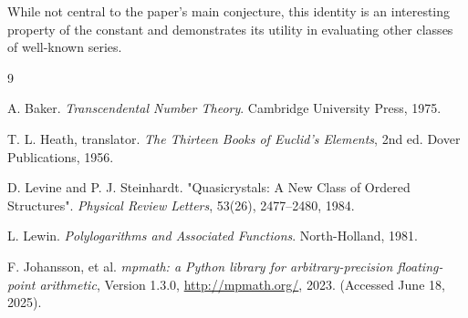 \documentclass{amsart}
\theoremstyle{plain}
\theoremstyle{definition}
\theoremstyle{remark}
\begin{document}
While not central to the paper's main conjecture, this identity is an interesting property of the constant and demonstrates its utility in evaluating other classes of well-known series.

\begin{thebibliography}{9}

A. Baker. \textit{Transcendental Number Theory}. Cambridge University Press, 1975. 

T. L. Heath, translator. \textit{The Thirteen Books of Euclid's Elements}, 2nd ed. Dover Publications, 1956. 

D. Levine and P. J. Steinhardt. "Quasicrystals: A New Class of Ordered Structures". \textit{Physical Review Letters}, 53(26), 2477--2480, 1984.

L. Lewin. \textit{Polylogarithms and Associated Functions}. North-Holland, 1981. 

F. Johansson, et al. \textit{mpmath: a Python library for arbitrary-precision floating-point arithmetic}, Version 1.3.0, \url{http://mpmath.org/}, 2023. (Accessed June 18, 2025).

\end{thebibliography}
\end{document}
